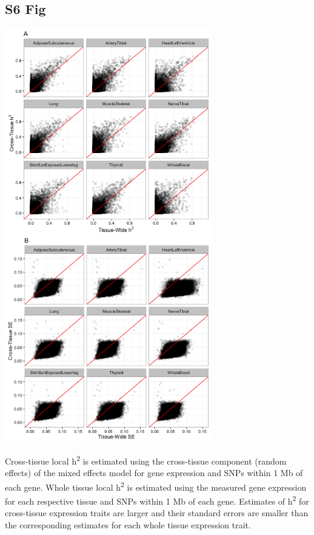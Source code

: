 \documentclass[10pt,letterpaper]{article}
\begin{document}
\begin{singlespace}
\subsection*{S6 Fig}
\includegraphics[width=9cm]{Figures/GenArch_Supp/S3Fig.png}
\label{S6_Fig}

 Cross-tissue local h\textsuperscript{2} is estimated using the cross-tissue component (random effects) of the mixed effects model for gene expression and SNPs within 1 Mb of each gene. Whole tissue local h\textsuperscript{2} is estimated using the measured gene expression for each respective tissue and SNPs within 1 Mb of each gene. Estimates of h\textsuperscript{2} for cross-tissue expression traits are larger and their standard errors are smaller than the corresponding estimates for each whole tissue expression trait.


\end{singlespace}
\end{document}
